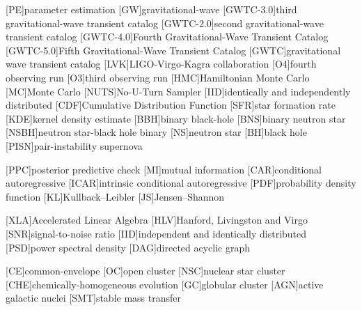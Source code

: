 [PE]{parameter estimation}
[GW]{gravitational-wave}
[GWTC-3.0]{third gravitational-wave transient catalog}
[GWTC-2.0]{second gravitational-wave transient catalog}
[GWTC-4.0]{Fourth Gravitational-Wave Transient Catalog}
[GWTC-5.0]{Fifth Gravitational-Wave Transient Catalog}
[GWTC]{gravitational wave transient catalog}
[LVK]{LIGO-Virgo-Kagra collaboration}
[O4]{fourth observing run}
[O3]{third observing run}
[HMC]{Hamiltonian Monte Carlo}
[MC]{Monte Carlo}
[NUTS]{No-U-Turn Sampler}
[IID]{identically and independently distributed}
[CDF]{Cumulative Distribution Function}
[SFR]{star formation rate}
[KDE]{kernel density estimate}
[BBH]{binary black-hole}
[BNS]{binary neutron star}
[NSBH]{neutron star-black hole binary}
[NS]{neutron star}
[BH]{black hole}
[PISN]{pair-instability supernova}

[PPC]{posterior predictive check}
[MI]{mutual information}
[CAR]{conditional autoregressive}
[ICAR]{intrinsic conditional autoregressive}
[PDF]{probability density function}
[KL]{Kullback--Leibler}
[JS]{Jensen--Shannon}

[XLA]{Accelerated Linear Algebra}
[HLV]{Hanford, Livingston and Virgo}
[SNR]{signal-to-noise ratio}
[IID]{independent and identically distributed}
[PSD]{power spectral density}
[DAG]{directed acyclic graph}

[CE]{common-envelope}
[OC]{open cluster}
[NSC]{nuclear star cluster}
[CHE]{chemically-homogeneous evolution}
[GC]{globular cluster}
[AGN]{active galactic nuclei}
[SMT]{stable mass transfer}
